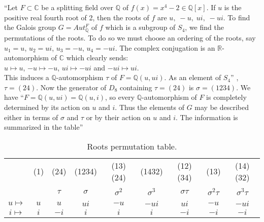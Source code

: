 ``Let \(F \subset \mathbb{C}\) be a splitting field over \(\mathbb{Q}\) of \(f(x)=x^4-2 \in \mathbb{Q}[x]\). If \(u\) is the positive real fourth root of 2, then the roots of \(f\) are \(u,\; -u,\; ui,\; -ui\). To find the  Galois group \(G = Aut_{\mathbb{Q}}^F\) of \(f\) which is a subgroup of \(S_4\), we find the permutations of the roots. To do so  we must choose an ordering of the roots, say \(u_1=u\), \(u_2=ui\), \(u_3=-u\), \(u_4= -ui\). The complex conjugation is an \(\mathbb{R}\)-automorphism of \(\mathbb{C}\) which clearly sends:\\
\(u \mapsto u\), \(-u \mapsto -u\), \(ui \mapsto -ui\) and \(-ui \mapsto ui\). \\
This induces a \(\mathbb{Q}\)-automorphism \(\tau\) of \(F=\mathbb{Q}(u,ui)\). As an element of \(S_4\)'' \cite{hunger}, \(\tau=(24)\).
Now the generator of \(D_8\) containing \(\tau = (24)\) is \(\sigma = (1234)\). We have ``\(F=\mathbb{Q}(u,ui)=\mathbb{Q}(u,i)\),
so every \(\mathbb{Q}\)-automorphism of \(F\) is completely determined by its action on \(u\) and \(i\). Thus the elements of \(G\)
may be described either in terms of \(\sigma\) and \(\tau\) or by their action on \(u\) and \(i\). The information is summarized in the table'' \cite{hunger}\\[1mm]
\begin{table}[h!]
\begin{tabular}{|c|c|c|c|c|c|c|c|c|}
  \hline
  \ & (1) & (24) & (1234) & (13)(24) & (1432) & (12)(34) & (13) & (14)(32) \\
  \ &  & \(\tau\)  & \(\sigma\) & \({\sigma}^2\) & \({\sigma}^3\) & \(\sigma \tau\) & \({\sigma}^2 \tau\) & \({\sigma}^3 \tau\) \\
  \hline
  \(u \mapsto\) & \(u\) & \(u\) & \(ui\) & \(-u\) & \(-ui\) & \(ui\) & \(-u\) & \(-ui\) \\
  \(i \mapsto\) & \(i\) & \(-i\) & \(i\) & \(i\) & \(i\) & \(-i\) & \(-i\) & \(-i\) \\
  \hline
\end{tabular}
\caption{\small Roots permutation table.}
\end{table}

